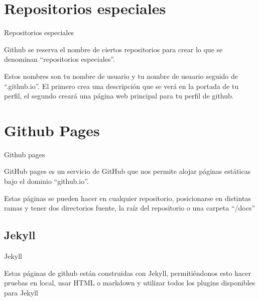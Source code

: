 \documentclass{beamer}
\begin{document}
\section{Repositorios especiales}
\begin{frame}{Repositorios especiales}

    Github se reserva el nombre de ciertos repositorios para crear lo que se denominan ``repositorios especiales''.

    Estos nombres son tu nombre de usuario y tu nombre de usuario seguido de ``.github.io''. El primero crea una descripción que se verá en la portada de tu perfil, el segundo creará una página web principal para tu perfil de github.

\end{frame}
\section{Github Pages}
\begin{frame}{Github pages}

    GitHub pages es un servicio de GitHub que nos permite alojar páginas estáticas bajo el dominio ``github.io''.

    Estas páginas se pueden hacer en cualquier repositorio, posicionarse en distintas ramas y tener dos directorios fuente, la raíz del repositorio o una carpeta ``/docs''

\end{frame}
\subsection{Jekyll}

\begin{frame}{Jekyll}

    Estas páginas de github están construidas con Jekyll, permitiéndonos esto hacer pruebas en local, usar HTML o markdown y utilizar todos los plugins disponibles para Jekyll

\end{frame}
\end{document}
